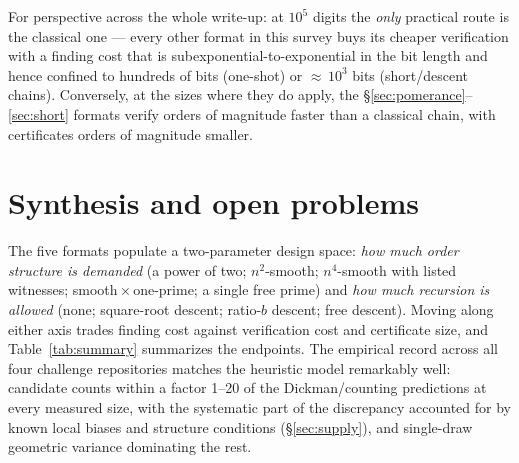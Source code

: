 \documentclass[11pt]{amsart}
\theoremstyle{plain}
\theoremstyle{definition}
\theoremstyle{remark}
\begin{document}
For perspective across the whole write-up: at $10^5$ digits the \emph{only} practical route is the
classical one --- every other format in this survey buys its cheaper verification with a finding cost
that is subexponential-to-exponential in the bit length and hence confined to hundreds of bits
(one-shot) or ${\approx}\,10^3$ bits (short/descent chains).  Conversely, at the sizes where they do
apply, the \S\ref{sec:pomerance}--\ref{sec:short} formats verify orders of magnitude faster than a
classical chain, with certificates orders of magnitude smaller.

\section{Synthesis and open problems}\label{sec:synthesis}

The five formats populate a two-parameter design space: \emph{how much order structure is demanded} (a
power of two; $n^2$-smooth; $n^4$-smooth with listed witnesses; smooth${}\times{}$one-prime; a single
free prime) and \emph{how much recursion is allowed} (none; square-root descent; ratio-$b$ descent;
free descent).  Moving along either axis trades finding cost against verification cost and certificate
size, and Table~\ref{tab:summary} summarizes the endpoints.  The empirical record across all four
challenge repositories matches the heuristic model remarkably well: candidate counts within a factor
1--20 of the Dickman/counting predictions at every measured size, with the systematic part of the
discrepancy accounted for by known local biases and structure conditions (\S\ref{sec:supply}), and
single-draw geometric variance dominating the rest.
\end{document}
